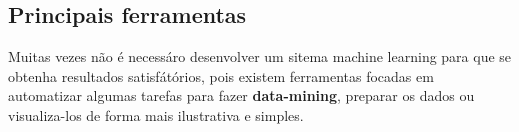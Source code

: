 \begin{figure}[h!]
	\centering
\end{figure}

\subsection{Principais ferramentas}
\label{subsec:ferramentas}
Muitas vezes não é necessáro desenvolver um sitema machine learning para que se obtenha resultados satisfátórios, pois existem
ferramentas focadas em automatizar algumas tarefas para fazer \textbf{data-mining}, preparar os dados  ou visualiza-los de forma mais 
ilustrativa e simples. 

  






    